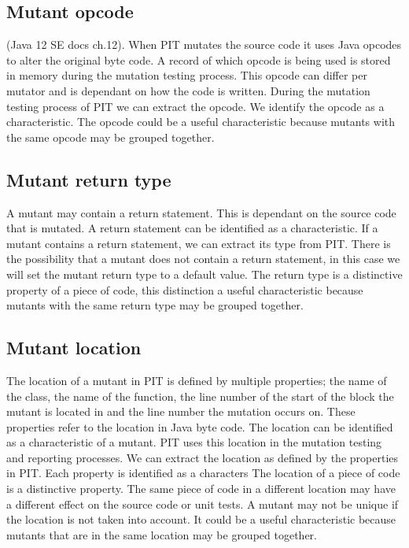 \documentclass[../main]{subfiles}
\begin{document}
\subsection{Mutant opcode}
 (Java 12 SE docs ch.12).
When PIT mutates the source code it uses Java opcodes to alter the original byte code. 
A record of which opcode is being used is stored in memory during the mutation testing process. 
This opcode can differ per mutator and is dependant on how the code is written.
During the mutation testing process of PIT we can extract the opcode.
We identify the opcode as a characteristic.
The opcode could be a useful characteristic because mutants with the same opcode may be grouped together.

\subsection{Mutant return type}
A mutant may contain a return statement. 
This is dependant on the source code that is mutated.
A return statement can be identified as a characteristic.
If a mutant contains a return statement, we can extract its type from PIT.
There is the possibility that a mutant does not contain a return statement, in this case we will set the mutant return type to a default value.
The return type is a distinctive property of a piece of code, this distinction a useful characteristic because mutants with the same return type may be grouped together.


\subsection{Mutant location}\label{ch:characteristics_location}
The location of a mutant in PIT is defined by multiple properties;
the name of the class, the name of the function, the line number of the start of the block the mutant is located in and the line number the mutation occurs on.
These properties refer to the location in Java byte code.
The location can be identified as a characteristic of a mutant.
PIT uses this location in the mutation testing and reporting processes.
We can extract the location as defined by the properties in PIT.
Each property is identified as a characters
The location of a piece of code is a distinctive property. 
The same piece of code in a different location may have a different effect on the source code or unit tests.
A mutant may not be unique if the location is not taken into account.
It could be a useful characteristic because mutants that are in the same location may be grouped together.
\end{document}

